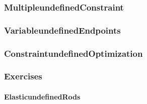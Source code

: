 \subsubsection{MultipleundefinedConstraint}

\subsubsection{VariableundefinedEndpoints}

\subsubsection{ConstraintundefinedOptimization}

\subsubsection{Exercises}

\paragraph{ElasticundefinedRods}

